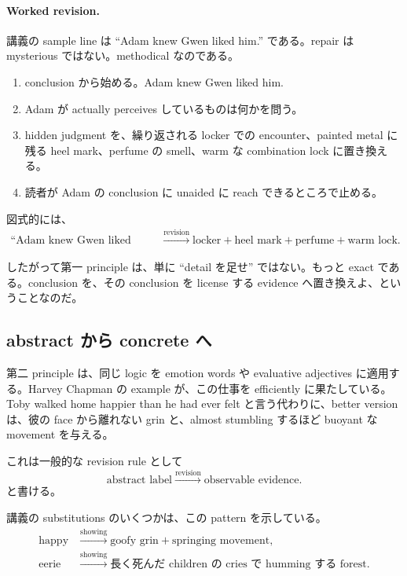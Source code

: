 \paragraph{Worked revision.} 講義の sample line は ``Adam knew Gwen liked him.'' である。repair は mysterious ではない。methodical なのである。
\begin{enumerate}
\item conclusion から始める。Adam knew Gwen liked him.
\item Adam が actually perceives しているものは何かを問う。
\item hidden judgment を、繰り返される locker での encounter、painted metal に残る heel mark、perfume の smell、warm な combination lock に置き換える。
\item 読者が Adam の conclusion に unaided に reach できるところで止める。
\end{enumerate}

図式的には、
\begin{align}
\text{``Adam knew Gwen liked him''}
&\xrightarrow{\text{revision}}
\text{locker} + \text{heel mark} + \text{perfume} + \text{warm lock}.
\end{align}

したがって第一 principle は、単に ``detail を足せ'' ではない。もっと exact である。conclusion を、その conclusion を license する evidence へ置き換えよ、ということなのだ。

\subsection{abstract から concrete へ}

第二 principle は、同じ logic を emotion words や evaluative adjectives に適用する。Harvey Chapman の example が、この仕事を efficiently に果たしている。Toby walked home happier than he had ever felt と言う代わりに、better version は、彼の face から離れない grin と、almost stumbling するほど buoyant な movement を与える。

これは一般的な revision rule として
\begin{equation}
\text{abstract label} \xrightarrow{\text{revision}} \text{observable evidence}.
\end{equation}
と書ける。

講義の substitutions のいくつかは、この pattern を示している。
\begin{align}
\text{happy}
&\xrightarrow{\text{showing}}
\text{goofy grin} + \text{springing movement},\\
\text{eerie}
&\xrightarrow{\text{showing}}
\text{長く死んだ children の cries で humming する forest}.
\end{align}

